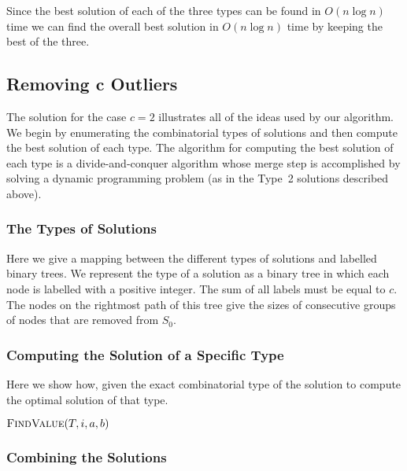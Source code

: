 \documentclass[lotsofwhite]{patmorin}
\begin{document}
Since the best solution of each of the three types can be found in
$O(n\log n)$ time we can find the overall best solution in $O(n\log
n)$ time by keeping the best of the three.

\subsection{Removing $\mathbf{c}$ Outliers}

The solution for the case $c=2$ illustrates all of the ideas used by
our algorithm.  We begin by enumerating the combinatorial types of
solutions and then compute the best solution of each type.  The
algorithm for computing the best solution of each type is a
divide-and-conquer algorithm whose merge step is accomplished by
solving a dynamic programming problem (as in the Type~2 solutions
described above).

\subsubsection{The Types of Solutions}

Here we give a mapping between the different types of solutions and
labelled binary trees. We represent the type of a solution as a binary
tree in which each node is labelled with a positive integer.  The sum
of all labels must be equal to $c$.  The nodes on the rightmost path
of this tree give the sizes of consecutive groups of nodes that are
removed from $S_0$.  

\subsubsection{Computing the Solution of a Specific Type}

Here we show how, given the exact combinatorial type of the solution
to compute the optimal solution of that type.

\noindent$\textsc{FindValue}(T,i,a,b)$
\begin{algorithmic}
   \ENDFOR
\ENDFOR
\end{algorithmic}



\subsubsection{Combining the Solutions}
\end{document}
